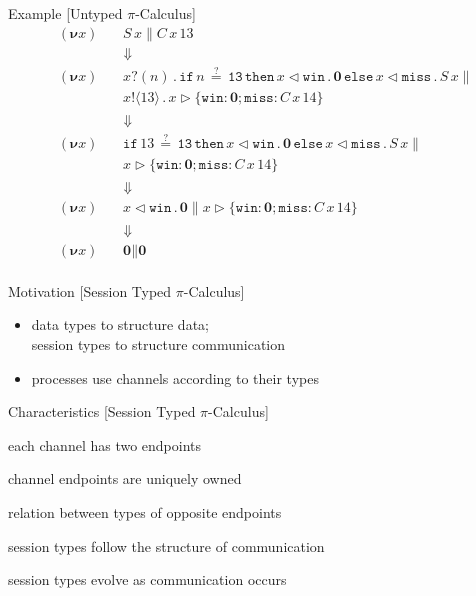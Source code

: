 \documentclass[dvipsnames]{beamer}
\newcommand{\sitem}{\item[\raisebox{.45ex}{\rule{.6ex}{.6ex}}]}
\newcommand{\Picalc}{$\pi$-Calculus}
\newcommand{\PO}{\textbf{0}}
\newcommand{\comp}[2]{#1 \parallel #2}
\newcommand{\new}[1]{(\boldsymbol{\nu} #1) \,}
\newcommand{\send}[2]{#1 !\langle #2 \rangle \, . \,}
\newcommand{\recv}[2]{#1 ?( #2 ) \, . \,}
\newcommand{\branch}[3]{#1 \triangleright \{ #2 \}_{#3}}
\newcommand{\select}[2]{#1 \triangleleft #2 \, . \,}
\newcommand{\slidetitle}[2]{#2 \hspace*{\fill} [#1]}
\begin{document}
  \begin{frame}{\slidetitle{Untyped \Picalc{}}{Example}}
    \vspace{-1em}
    \begin{align*}
      & \new{x} && \comp{S \, x}{C \, x \, 13} \\
      & && \Downarrow \\
      & \new{x} && \comp{\recv{x}{n} \mathtt{if} \, n \, \mathtt{\stackrel{?}{=}} \, \mathtt{13} \, \mathtt{then} \, \select{x}{\mathtt{win}} \PO \, \mathtt{else} \, \select{x}{\mathtt{miss}} S \, x}{\\
      & && \send{x}{13} \branch{x}{ \mathtt{win} : \PO; \mathtt{miss} : C \, x \, 14}{}} \\
      & && \Downarrow \\
      & \new{x} && \comp{\mathtt{if} \, 13 \, \mathtt{\stackrel{?}{=}} \, \mathtt{13} \, \mathtt{then} \, \select{x}{\mathtt{win}} \PO \, \mathtt{else} \, \select{x}{\mathtt{miss}} S \, x}{\\
      & && \branch{x}{ \mathtt{win} : \PO; \mathtt{miss} : C \, x \, 14}{}} \\
      & && \Downarrow \\
      & \new{x} && \comp{\select{x}{\mathtt{win}} \PO}{\branch{x}{ \mathtt{win} : \PO; \mathtt{miss} : C \, x \, 14}{}} \\
      & && \Downarrow \\
      & \new{x} && \comp{\PO}{\PO} \\
    \end{align*}
  \end{frame}
  
  \begin{frame}{\slidetitle{Session Typed \Picalc{}}{Motivation}}
    \begin{itemize}
      \setlength\itemsep{1em}
      \sitem data types to structure data;\\
             session types to structure communication
      \sitem processes use channels according to their types
    \end{itemize}
  \end{frame}

  \begin{frame}{\slidetitle{Session Typed \Picalc{}}{Characteristics}}
    \begin{description}
      \setlength\itemsep{1em}
      \item[endpoints] each channel has two endpoints
      \item[linearity] channel endpoints are uniquely owned
      \item[duality] relation between types of opposite endpoints
      \item[structure] session types follow the structure of communication
      \item[change] session types evolve as communication occurs
    \end{description}
  \end{frame}
\end{document}
